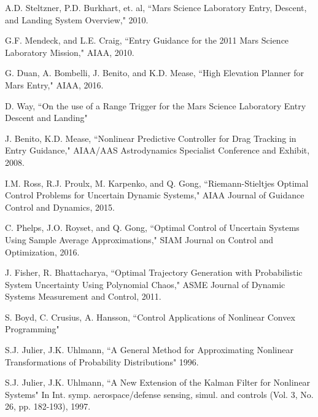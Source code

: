 \documentclass[10pt,a4paper]{article}
\begin{document}
	

	
	\begin{thebibliography}{1}
		

		A.D. Steltzner, P.D. Burkhart, et. al, ``Mars Science Laboratory Entry, Descent, and Landing System Overview," 2010.
				
		G.F. Mendeck, and L.E. Craig, ``Entry Guidance for the 2011 Mars Science Laboratory Mission," AIAA, 2010.
		
		G. Duan, A. Bombelli, J. Benito, and K.D. Mease, ``High Elevation Planner for Mars Entry," AIAA, 2016.
		
		D. Way, ``On the use of a Range Trigger for the Mars Science Laboratory Entry Descent and Landing"
		
		J. Benito, K.D. Mease, ``Nonlinear Predictive Controller for Drag Tracking in Entry Guidance," AIAA/AAS Astrodynamics Specialist Conference and Exhibit, 2008.
		
		I.M. Ross, R.J. Proulx, M. Karpenko, and Q. Gong, ``Riemann-Stieltjes Optimal Control Problems for Uncertain Dynamic Systems," AIAA Journal of Guidance Control and Dynamics, 2015.
		
		C. Phelps, J.O. Royset, and Q. Gong, ``Optimal Control of Uncertain Systems Using Sample Average Approximations," SIAM Journal on Control and Optimization, 2016.
		
		J. Fisher, R. Bhattacharya, ``Optimal Trajectory Generation with Probabilistic System Uncertainty Using Polynomial Chaos," ASME Journal of Dynamic Systems Measurement and Control, 2011.
		
		S. Boyd, C. Crusius, A. Hansson, ``Control Applications of Nonlinear Convex Programming"
		
		S.J. Julier, J.K. Uhlmann, ``A General Method for Approximating Nonlinear Transformations of Probability Distributions" 1996.

		S.J. Julier, J.K. Uhlmann, ``A New Extension of the Kalman Filter for Nonlinear Systems" In Int. symp. aerospace/defense sensing, simul. and controls (Vol. 3, No. 26, pp. 182-193), 1997.
		

\end{thebibliography}
\end{document}
